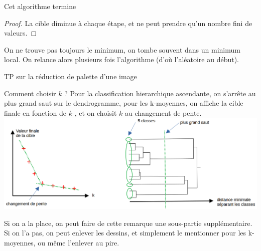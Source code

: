 \begin{proposition}
	Cet algorithme termine
\end{proposition}

\begin{proof}
	La cible diminue à chaque étape, et ne peut prendre qu'un nombre fini de valeurs.
\end{proof}

\begin{rem}
	On ne trouve pas toujours le minimum, on tombe souvent dans un minimum local. On relance alors plusieurs fois l'algorithme (d'où l'aléatoire au début).
\end{rem}

\begin{exercise}
	TP sur la réduction de palette d'une image
\end{exercise}

\begin{rem}
	Comment choisir $k$ ? Pour la classification hierarchique ascendante, on s'arrête au plus grand saut sur le dendrogramme, pour les k-moyennes, on affiche la cible finale en fonction de $k$ , et on choisit $k$ au changement de pente.\\
	\includegraphics[width=\linewidth]{lecon/15-ml/choix_k.png}
\end{rem}

\begin{com}
	Si on a la place, on peut faire de cette remarque une sous-partie supplémentaire. Si on l'a pas, on peut enlever les dessins, et simplement le mentionner pour les k-moyennes, ou même l'enlever au pire.
\end{com}